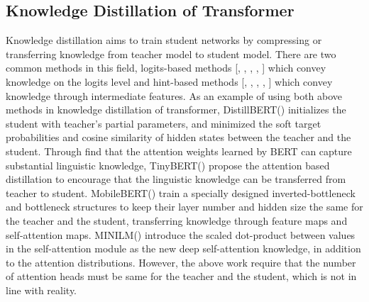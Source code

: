 \subsection{Knowledge Distillation of Transformer}
Knowledge distillation\cite{hinton2015distilling} aims to train student networks by compressing or transferring knowledge from teacher model to student model. There are two common methods in this field, logits-based methods [\cite{cho2019efficacy}, \cite{furlanello2018born}, \cite{mirzadeh2020improved}, \cite{zhang2018deep}, \cite{zhao2022decoupled}] which convey knowledge on the logits level and hint-based methods [\cite{heo2019knowledge}, \cite{huang2017like}, \cite{kim2018paraphrasing}, \cite{park2019relational}, \cite{peng2019correlation}] which convey knowledge through intermediate features. As an example of using both above methods in knowledge distillation of transformer, DistillBERT(\cite{DBLP:journals/corr/abs-1910-01108}) initializes the student with teacher’s partial parameters, and minimized the soft target probabilities and cosine similarity of hidden states between the teacher and the student. Through \cite{DBLP:journals/corr/abs-1904-04063} find that the attention weights learned by BERT can capture substantial linguistic knowledge, TinyBERT(\cite{DBLP:journals/corr/abs-1909-10351}) propose the attention based distillation to encourage that the linguistic knowledge can be transferred from teacher to student. MobileBERT(\cite{sun2020mobilebert}) train a specially designed inverted-bottleneck and bottleneck structures to keep their layer number and hidden size the same for the teacher and the student, transferring knowledge through feature maps and self-attention maps. MINILM(\cite{wang2020minilm}) introduce the scaled dot-product between values in the self-attention module as the new deep self-attention knowledge, in addition to the attention distributions. However, the above work require that the number of attention heads must be same for the teacher and the student, which is not in line with reality. 

